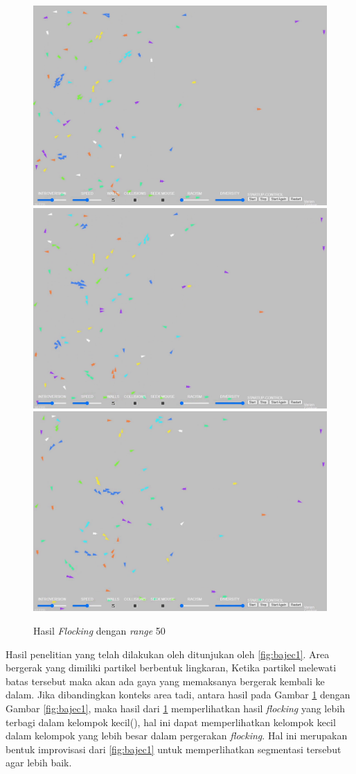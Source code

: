 \begin{figure}
    \\[\smallskipamount]
    \includegraphics[width=.32\textwidth]{gambar/sequenceperbandingan/00600.png}\hfill
    \includegraphics[width=.32\textwidth]{gambar/sequenceperbandingan/00700.png}\hfill
    \includegraphics[width=.32\textwidth]{gambar/sequenceperbandingan/00800.png}

    \caption{Hasil \textit{Flocking} dengan \textit{range} 50}\label{fig:sequenceperbandingan}
\end{figure}

\hspace{0.6cm}Hasil penelitian yang telah dilakukan oleh \citep{Bajec2007} ditunjukan oleh \ref{fig:bajec1}. Area bergerak yang dimiliki partikel berbentuk lingkaran, Ketika partikel melewati batas tersebut maka akan ada gaya yang memaksanya bergerak kembali ke dalam. Jika dibandingkan konteks area tadi, antara hasil pada Gambar \ref{fig:sequenceperbandingan} dengan Gambar \ref{fig:bajec1}, maka hasil dari \ref{fig:sequenceperbandingan} memperlihatkan hasil \textit{flocking} yang lebih terbagi dalam kelompok kecil(), hal ini dapat memperlihatkan kelompok kecil dalam kelompok yang lebih besar dalam pergerakan \textit{flocking}. Hal ini merupakan bentuk improvisasi dari \ref{fig:bajec1} untuk memperlihatkan segmentasi tersebut agar lebih baik.

